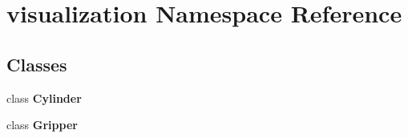 \section{visualization Namespace Reference}
\label{namespacevisualization}
\subsection*{Classes}
\begin{DoxyCompactItemize}
\item 
class {\bf Cylinder}
\item 
class {\bf Gripper}
\end{DoxyCompactItemize}
